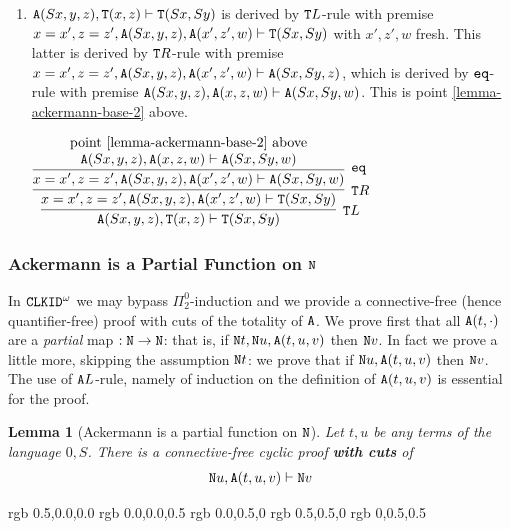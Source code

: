 \documentclass[a4paper,12pt]{article}
\newtheorem{lemma}[theorem]{Lemma}
\newenvironment{proof}[1][Proof]{\begin{trivlist}
\item[\hskip \labelsep {\bfseries #1}]}{\end{trivlist}}
\newcommand{\Nat}               { {\tt N}  }
\newcommand{\eq}              { {\tt eq} }
\newcommand{\Tot}           { {\tt T} }
\newcommand{\Ack}   {{\tt A}}
\newcommand{\CLKID} { {\tt CLKID} }
\begin{document}
\begin{proof}
\begin{enumerate}
\item 
$\Ack(Sx,y,z), \Tot(x,z) \vdash \Tot(Sx,Sy)$ is derived by $\Tot L$-rule with premise 
$x=x', z=z', \Ack(Sx,y,z), \Ack(x',z',w) \vdash \Tot(Sx,Sy)$ with $x',z',w$ fresh.
This latter is derived by $\Tot R$-rule with premise $x=x', z=z', \Ack(Sx,y,z), \Ack(x',z',w) \vdash  \Ack(Sx,Sy,z)$,
which is derived by $\eq$-rule with premise $\Ack(Sx,y,z), \Ack(x,z,w) \vdash \Ack(Sx,Sy,w)$.
This is point \ref{lemma-ackermann-base-2} above.

\begin{center}
$
\infer[\Tot L]
 {\Ack(Sx,y,z), \Tot(x,z) \vdash \Tot(Sx,Sy)}
 {\infer[\Tot R]
    {x=x', z=z', \Ack(Sx,y,z), \Ack(x',z',w) \vdash \Tot(Sx,Sy)}
    {\infer[\eq]
      {x=x', z=z', \Ack(Sx,y,z), \Ack(x',z',w) \vdash  \Ack(Sx,Sy,w)}
      {\deduce{\Ack(Sx,y,z), \Ack(x,z,w) \vdash \Ack(Sx,Sy,w)}
                     {\mbox{ point \ref{lemma-ackermann-base-2} above }}
      }
    }
 }
$
\end{center}

\end{enumerate}
\end{proof}

\subsubsection{Ackermann is a Partial Function on $\Nat$}
In $\CLKID^\omega$ we may bypass $\Pi^0_2$-induction and we provide a connective-free 
(hence quantifier-free) proof with cuts of the totality of $\Ack$. 
We prove first that all $\Ack(t,\cdot)$ 
are a \emph{partial} map $:\Nat \rightarrow \Nat$: that is, if $\Nat t, \Nat u, \Ack(t,u,v)$ then
$\Nat v$. In fact we prove a little more, skipping the assumption $\Nat t$: we prove that 
if $\Nat u, \Ack(t,u,v)$ then $\Nat v$. The use of $\Ack L$-rule, namely of induction on
the definition of $\Ack(t,u,v)$ is essential for the proof.


\begin{lemma}[Ackermann is a partial function on $\Nat$]
\label{lemma-ackermann-partial}
Let $t,u$ be any terms of the language $0,S$. There is a connective-free cyclic proof 
{\bf with cuts} of $$\Nat u, \Ack(t,u,v) \vdash \Nat v$$
\end{lemma}

\definecolor{darkred}       {rgb} {0.5,0.0,0.0}
\definecolor{darkblue}     {rgb} {0.0,0.0,0.5}
\definecolor{darkgreen}   {rgb} {0.0,0.5,0}
\definecolor{darkyellow} {rgb} {0.5,0.5,0}
\definecolor{darkcyan}    {rgb} {0,0.5,0.5}
\end{document}
